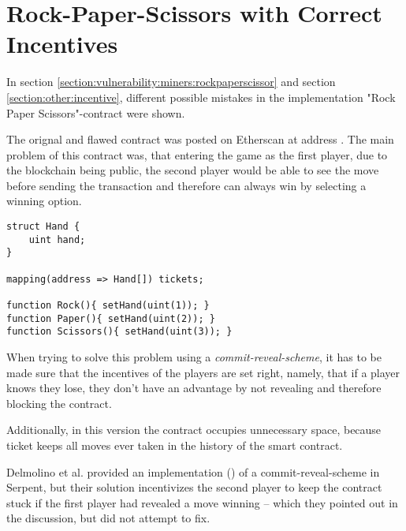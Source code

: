 \section{Rock-Paper-Scissors with Correct Incentives}
\label{appendix:rpsincentivescorrected}

In section \ref{section:vulnerability:miners:rockpaperscissor} and section \ref{section:other:incentive}, different possible mistakes in the implementation "Rock Paper Scissors"-contract were shown.


The orignal and flawed contract was posted on Etherscan at address \cite{etherscan:rockpaperscissor}. The main problem of this contract was, that entering the game as the first player, due to the blockchain being public, the second player would be able to see the move before sending the transaction and therefore can always win by selecting a winning option.

\begin{verbatim}
struct Hand {
    uint hand;
}

mapping(address => Hand[]) tickets;

function Rock(){ setHand(uint(1)); }
function Paper(){ setHand(uint(2)); }
function Scissors(){ setHand(uint(3)); }
\end{verbatim}

When trying to solve this problem using a \textit{commit-reveal-scheme}, it has to be made sure that the incentives of the players are set right, namely, that if a player knows they lose, they don't have an advantage by not revealing and therefore blocking the contract.

Additionally, in this version  the contract occupies unnecessary space, because ticket keeps all moves ever taken in the history of the smart contract.

Delmolino et al. provided an implementation (\cite{delmolino:rps}) of a commit-reveal-scheme in Serpent, but their solution incentivizes the second player to keep the contract stuck if the first player had revealed a move winning -- which they pointed out in the discussion, but did not attempt to fix.

